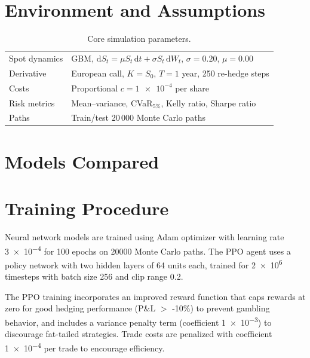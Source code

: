 \documentclass[11pt,letterpaper]{article}
\begin{document}
\section{Environment and Assumptions}\label{sec:env}
\begin{table}[h]
  \centering
  \caption{Core simulation parameters.}
  \begin{tabularx}{\linewidth}{@{}lX@{}}
    \toprule
    Spot dynamics & GBM, $\mathrm{d}S_t = \mu S_t\,\mathrm{d}t + \sigma S_t\,\mathrm{d}W_t$, $\sigma=\num{0.20}$, $\mu=\num{0.00}$ \\
    Derivative    & European call, $K=S_0$, $T=1$ year, 250 re-hedge steps      \\
    Costs         & Proportional $c=\num{1e-4}$ per share                        \\
    Risk metrics  & Mean--variance, CVaR$_{5\%}$, Kelly ratio, Sharpe ratio            \\
    Paths         & Train/test 20\,000 Monte Carlo paths                                 \\
    \bottomrule
  \end{tabularx}
\end{table}

\section{Models Compared}

\section{Training Procedure}
Neural network models are trained using Adam optimizer with learning rate \num{3e-4} for \num{100} epochs on \num{20000} Monte Carlo paths. The PPO agent uses a policy network with two hidden layers of 64 units each, trained for \num{2e6} timesteps with batch size 256 and clip range 0.2. 

The PPO training incorporates an improved reward function that caps rewards at zero for good hedging performance (P\&L $>$ -10\%) to prevent gambling behavior, and includes a variance penalty term (coefficient \num{1e-3}) to discourage fat-tailed strategies. Trade costs are penalized with coefficient \num{1e-4} per trade to encourage efficiency.
\end{document}
